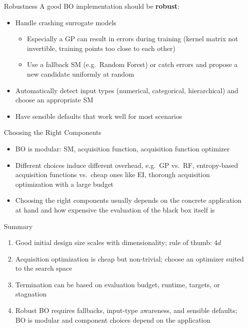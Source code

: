 \documentclass[main]{subfiles}
\begin{document}
\begin{frame}{Robustness}
    A good BO implementation should be \textbf{robust}:
    \begin{itemize}
        \item Handle crashing surrogate models
            \begin{itemize}
                \item Especially a GP can result in errors during training (kernel matrix not invertible, training points too close to each other)
                \item Use a fallback SM (e.g.\ Random Forest) or catch errors and propose a new candidate uniformly at random
            \end{itemize}
        \item Automatically detect input types (numerical, categorical, hierarchical) and choose an appropriate SM
        \item Have sensible defaults that work well for most scenarios
    \end{itemize}
\end{frame}


\begin{frame}{Choosing the Right Components}
    \begin{itemize}
        \item BO is modular: SM, acquisition function, acquisition function optimizer
        \item Different choices induce different overhead, e.g.\ GP vs.\ RF, entropy-based acquisition functions vs.\ cheap ones like EI, thorough acquisition optimization with a large budget
        \item Choosing the right components usually depends on the concrete application at hand and how expensive the evaluation of the black box itself is
    \end{itemize}
\end{frame}


\begin{frame}{Summary}
\begin{enumerate}
    \item Good initial design size scales with dimensionality; rule of thumb: $4d$
    \item Acquisition optimization is cheap but non-trivial; choose an optimizer suited to the search space
    \item Termination can be based on evaluation budget, runtime, targets, or stagnation
    \item Robust BO requires fallbacks, input-type awareness, and sensible defaults; BO is modular and component choices depend on the application
\end{enumerate}
\end{frame}
\end{document}
